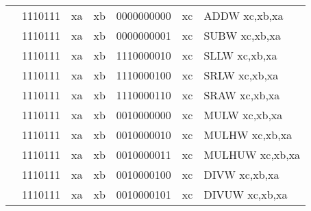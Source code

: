 \begin{table}[p]
\begin{small}
\begin{center}
\begin{tabular}{rcccccccccl}
&
\multicolumn{2}{|c|}{1110111} &
\multicolumn{1}{c|}{xa} &
\multicolumn{1}{c|}{xb} &
\multicolumn{4}{c|}{0000000000} &
\multicolumn{1}{c|}{xc} & ADDW xc,xb,xa \\
\cline{2-10}
  

&
\multicolumn{2}{|c|}{1110111} &
\multicolumn{1}{c|}{xa} &
\multicolumn{1}{c|}{xb} &
\multicolumn{4}{c|}{0000000001} &
\multicolumn{1}{c|}{xc} & SUBW xc,xb,xa \\
\cline{2-10}
  

&
\multicolumn{2}{|c|}{1110111} &
\multicolumn{1}{c|}{xa} &
\multicolumn{1}{c|}{xb} &
\multicolumn{4}{c|}{1110000010} &
\multicolumn{1}{c|}{xc} & SLLW xc,xb,xa \\
\cline{2-10}
  

&
\multicolumn{2}{|c|}{1110111} &
\multicolumn{1}{c|}{xa} &
\multicolumn{1}{c|}{xb} &
\multicolumn{4}{c|}{1110000100} &
\multicolumn{1}{c|}{xc} & SRLW xc,xb,xa \\
\cline{2-10}
  

&
\multicolumn{2}{|c|}{1110111} &
\multicolumn{1}{c|}{xa} &
\multicolumn{1}{c|}{xb} &
\multicolumn{4}{c|}{1110000110} &
\multicolumn{1}{c|}{xc} & SRAW xc,xb,xa \\
\cline{2-10}
  

&
\multicolumn{2}{|c|}{1110111} &
\multicolumn{1}{c|}{xa} &
\multicolumn{1}{c|}{xb} &
\multicolumn{4}{c|}{0010000000} &
\multicolumn{1}{c|}{xc} & MULW xc,xb,xa \\
\cline{2-10}
  

&
\multicolumn{2}{|c|}{1110111} &
\multicolumn{1}{c|}{xa} &
\multicolumn{1}{c|}{xb} &
\multicolumn{4}{c|}{0010000010} &
\multicolumn{1}{c|}{xc} & MULHW xc,xb,xa \\
\cline{2-10}
  

&
\multicolumn{2}{|c|}{1110111} &
\multicolumn{1}{c|}{xa} &
\multicolumn{1}{c|}{xb} &
\multicolumn{4}{c|}{0010000011} &
\multicolumn{1}{c|}{xc} & MULHUW xc,xb,xa \\
\cline{2-10}
  

&
\multicolumn{2}{|c|}{1110111} &
\multicolumn{1}{c|}{xa} &
\multicolumn{1}{c|}{xb} &
\multicolumn{4}{c|}{0010000100} &
\multicolumn{1}{c|}{xc} & DIVW xc,xb,xa \\
\cline{2-10}
  

&
\multicolumn{2}{|c|}{1110111} &
\multicolumn{1}{c|}{xa} &
\multicolumn{1}{c|}{xb} &
\multicolumn{4}{c|}{0010000101} &
\multicolumn{1}{c|}{xc} & DIVUW xc,xb,xa \\
\cline{2-10}
  


\end{tabular}
\end{center}
\end{small}
\end{table}
